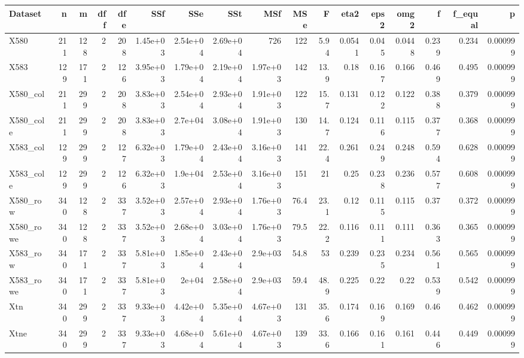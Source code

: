 \begin{tabular}{lrrrrrrrrrrrrrrrr}
\hline
Dataset & n & m & dff & dfe & SSf & SSe & SSt & MSf & MSe & F & eta2 & eps2 & omg2 & f & f\_equal & p \\
\hline
X580 & 211 & 128 & 2 & 208 & 1.45e+03 & 2.54e+04 & 2.69e+04 & 726 & 122 & 5.94 & 0.0541 & 0.045 & 0.0448 & 0.239 & 0.234 & 0.000999 \\
X583 & 129 & 171 & 2 & 126 & 3.95e+03 & 1.79e+04 & 2.19e+04 & 1.97e+03 & 142 & 13.9 & 0.18 & 0.167 & 0.166 & 0.469 & 0.495 & 0.000999 \\
X580\_col & 211 & 299 & 2 & 208 & 3.83e+03 & 2.54e+04 & 2.93e+04 & 1.91e+03 & 122 & 15.7 & 0.131 & 0.122 & 0.122 & 0.388 & 0.379 & 0.000999 \\
X580\_cole & 211 & 299 & 2 & 208 & 3.83e+03 & 2.7e+04 & 3.08e+04 & 1.91e+03 & 130 & 14.7 & 0.124 & 0.116 & 0.115 & 0.377 & 0.368 & 0.000999 \\
X583\_col & 129 & 299 & 2 & 127 & 6.32e+03 & 1.79e+04 & 2.43e+04 & 3.16e+03 & 141 & 22.4 & 0.261 & 0.249 & 0.248 & 0.594 & 0.628 & 0.000999 \\
X583\_cole & 129 & 299 & 2 & 126 & 6.32e+03 & 1.9e+04 & 2.53e+04 & 3.16e+03 & 151 & 21 & 0.25 & 0.238 & 0.236 & 0.577 & 0.608 & 0.000999 \\
X580\_row & 340 & 128 & 2 & 337 & 3.52e+03 & 2.57e+04 & 2.93e+04 & 1.76e+03 & 76.4 & 23.1 & 0.12 & 0.115 & 0.115 & 0.37 & 0.372 & 0.000999 \\
X580\_rowe & 340 & 128 & 2 & 337 & 3.52e+03 & 2.68e+04 & 3.03e+04 & 1.76e+03 & 79.5 & 22.2 & 0.116 & 0.111 & 0.111 & 0.363 & 0.365 & 0.000999 \\
X583\_row & 340 & 171 & 2 & 337 & 5.81e+03 & 1.85e+04 & 2.43e+04 & 2.9e+03 & 54.8 & 53 & 0.239 & 0.235 & 0.234 & 0.561 & 0.565 & 0.000999 \\
X583\_rowe & 340 & 171 & 2 & 337 & 5.81e+03 & 2e+04 & 2.58e+04 & 2.9e+03 & 59.4 & 48.9 & 0.225 & 0.22 & 0.22 & 0.539 & 0.542 & 0.000999 \\
Xtn & 340 & 299 & 2 & 337 & 9.33e+03 & 4.42e+04 & 5.35e+04 & 4.67e+03 & 131 & 35.6 & 0.174 & 0.169 & 0.169 & 0.46 & 0.462 & 0.000999 \\
Xtne & 340 & 299 & 2 & 337 & 9.33e+03 & 4.68e+04 & 5.61e+04 & 4.67e+03 & 139 & 33.6 & 0.166 & 0.161 & 0.161 & 0.446 & 0.449 & 0.000999 \\
\hline
\end{tabular}
